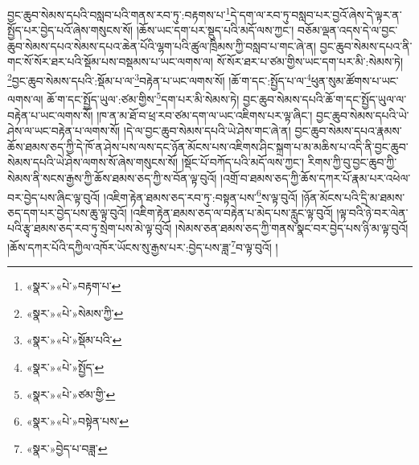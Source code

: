 བྱང་ཆུབ་སེམས་དཔའི་བསླབ་པའི་གནས་རབ་ཏུ་:བརྟགས་པ་\footnote{«སྣར་»«པེ་»བརྟག་པ་}དེ་དག་ལ་རབ་ཏུ་བསླབ་པར་བྱའོ་ཞེས་དེ་ལྟར་ན་སྤྱོད་པར་བྱེད་པའོ་ཞེས་གསུངས་སོ། །ཆོས་ཡང་དག་པར་སྡུད་པའི་མདོ་ལས་ཀྱང་། བཅོམ་ལྡན་འདས་དེ་ལ་བྱང་ཆུབ་སེམས་དཔའ་སེམས་དཔའ་ཆེན་པོའི་ལྷག་པའི་ཚུལ་ཁྲིམས་ཀྱི་བསླབ་པ་གང་ཞེ་ན། བྱང་ཆུབ་སེམས་དཔའ་ནི་གང་སོ་སོར་ཐར་པའི་སྡོམ་པས་བསྡམས་པ་ཡང་ལགས་ལ། སོ་སོར་ཐར་པ་ཙམ་གྱིས་ཡང་དག་པར་མི་:སེམས་ཏེ། \footnote{«སྣར་»«པེ་»སེམས་ཀྱི་}བྱང་ཆུབ་སེམས་དཔའི་:སྡོམ་པ་ལ་\footnote{«སྣར་»«པེ་»སྡོམ་པའི་}བརྟེན་པ་ཡང་ལགས་སོ། །ཆོ་ག་དང་:སྤྱོད་པ་ལ་\footnote{«སྣར་»«པེ་»སྤྱོད་}ཕུན་སུམ་ཚོགས་པ་ཡང་ལགས་ལ། ཆོ་ག་དང་སྤྱོད་ཡུལ་:ཙམ་གྱིས་\footnote{«སྣར་»«པེ་»ཙམ་གྱི་}དག་པར་མི་སེམས་ཏེ། བྱང་ཆུབ་སེམས་དཔའི་ཆོ་ག་དང་སྤྱོད་ཡུལ་ལ་བརྟེན་པ་ཡང་ལགས་སོ། །ཁ་ན་མ་ཐོ་བ་ཕྲ་རབ་ཙམ་དག་ལ་ཡང་འཇིགས་པར་ལྟ་ཞིང་། བྱང་ཆུབ་སེམས་དཔའི་ཡེ་ཤེས་ལ་ཡང་བརྟེན་པ་ལགས་སོ། །དེ་ལ་བྱང་ཆུབ་སེམས་དཔའི་ཡེ་ཤེས་གང་ཞེ་ན། བྱང་ཆུབ་སེམས་དཔའ་རྣམས་ཆོས་ཐམས་ཅད་ཀྱི་དེ་ཁོ་ན་ཤེས་པས་ལས་དང་ཉོན་མོངས་པས་འཇིགས་ཤིང་སྐྲག་པ་མ་མཆིས་པ་འདི་ནི་བྱང་ཆུབ་སེམས་དཔའི་ཡེ་ཤེས་ལགས་སོ་ཞེས་གསུངས་སོ། །སྡོང་པོ་བཀོད་པའི་མདོ་ལས་ཀྱང་། རིགས་ཀྱི་བུ་བྱང་ཆུབ་ཀྱི་སེམས་ནི་སངས་རྒྱས་ཀྱི་ཆོས་ཐམས་ཅད་ཀྱི་ས་བོན་ལྟ་བུའོ། །འགྲོ་བ་ཐམས་ཅད་ཀྱི་ཆོས་དཀར་པོ་རྣམ་པར་འཕེལ་བར་བྱེད་པས་ཞིང་ལྟ་བུའོ། །འཇིག་རྟེན་ཐམས་ཅད་རབ་ཏུ་:བསྟན་པས་\footnote{«སྣར་»«པེ་»བསྟེན་པས་}ས་ལྟ་བུའོ། །ཉོན་མོངས་པའི་དྲི་མ་ཐམས་ཅད་དག་པར་བྱེད་པས་ཆུ་ལྟ་བུའོ། །འཇིག་རྟེན་ཐམས་ཅད་ལ་བརྟེན་པ་མེད་པས་རླུང་ལྟ་བུའོ། །ལྟ་བའི་ཉེ་བར་ལེན་པའི་རྩྭ་ཐམས་ཅད་རབ་ཏུ་སྲེག་པས་མེ་ལྟ་བུའོ། །སེམས་ཅན་ཐམས་ཅད་ཀྱི་གནས་སྣང་བར་བྱེད་པས་ཉི་མ་ལྟ་བུའོ། །ཆོས་དཀར་པོའི་དཀྱིལ་འཁོར་ཡོངས་སུ་རྒྱས་པར་:བྱེད་པས་ཟླ་\footnote{«སྣར་»བྱེད་པ་བཟླ་}བ་ལྟ་བུའོ། །
